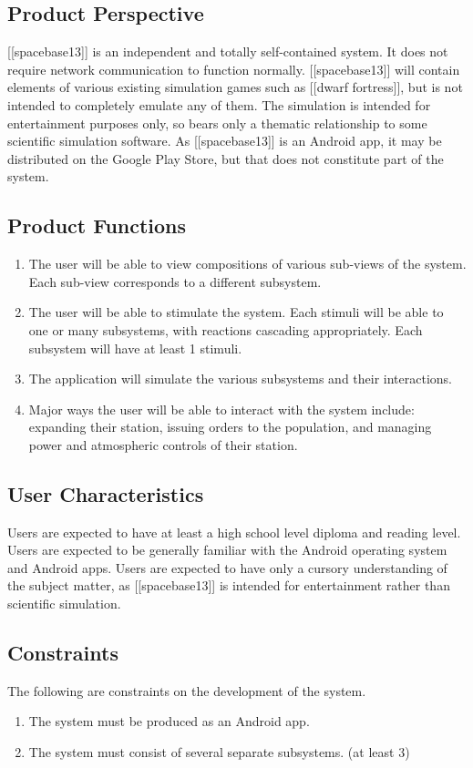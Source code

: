 \documentclass[]{article}
\begin{document}
\subsection{Product Perspective}
\label{sub:product_perspective}
	[[spacebase13]] is an independent and totally self-contained system. It does not require network communication to function normally. [[spacebase13]] will contain elements of various existing simulation games such as [[dwarf fortress]], but is not intended to completely emulate any of them. The simulation is intended for entertainment purposes only, so bears only a thematic relationship to some scientific simulation software. As [[spacebase13]] is an Android app, it may be distributed on the Google Play Store, but that does not constitute part of the system.

\subsection{Product Functions}
\label{sub:product_functions}
	\begin{enumerate}
		\item The user will be able to view compositions of various sub-views of the system. Each sub-view corresponds to a different subsystem.
		\item The user will be able to stimulate the system. Each stimuli will be able to one or many subsystems, with reactions cascading appropriately. Each subsystem will have at least 1 stimuli.
		\item The application will simulate the various subsystems and their interactions.
		\item Major ways the user will be able to interact with the system include: expanding their station, issuing orders to the population, and managing power and atmospheric controls of their station.
	\end{enumerate}

\subsection{User Characteristics}
\label{sub:user_characteristics}
	Users are expected to have at least a high school level diploma and reading level. Users are expected to be generally familiar with the Android operating system and Android apps. Users are expected to have only a cursory understanding of the subject matter, as [[spacebase13]] is intended for entertainment rather than scientific simulation.

\subsection{Constraints}
\label{sub:constraints}
	The following are constraints on the development of the system.
	\begin{enumerate}
		\item The system must be produced as an Android app.
		\item The system must consist of several separate subsystems. (at least 3)
	\end{enumerate}
\end{document}
